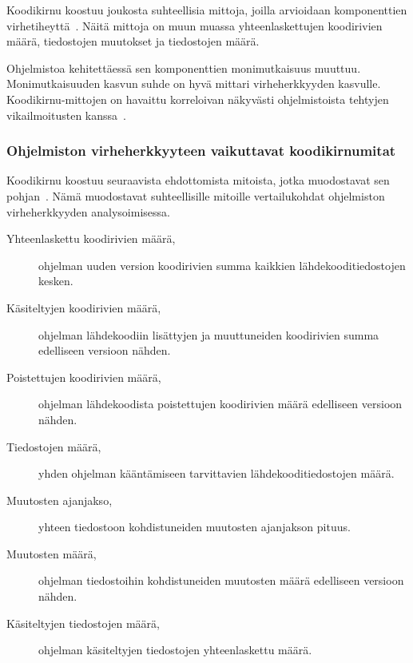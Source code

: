 \documentclass[finnish]{../tktltiki2}
\theoremstyle{definition}
\theoremstyle{remark}
\begin{document}
    Koodikirnu koostuu joukosta suhteellisia mittoja, joilla arvioidaan komponenttien virhetiheyttä~\cite{NB05}. Näitä 
mittoja on muun muassa yhteenlaskettujen koodirivien määrä, tiedostojen muutokset ja tiedostojen määrä.

    Ohjelmistoa kehitettäessä sen komponenttien monimutkaisuus muuttuu. Monimutkaisuuden kasvun suhde on hyvä mittari 
virheherkkyyden kasvulle. Koodikirnu-mittojen on havaittu korreloivan näkyvästi ohjelmistoista tehtyjen vikailmoitusten 
kanssa~\cite{NB05}.

\subsubsection{Ohjelmiston virheherkkyyteen vaikuttavat koodikirnumitat}

Koodikirnu koostuu seuraavista ehdottomista mitoista, jotka muodostavat sen pohjan~\cite{NB05}. Nämä muodostavat 
suhteellisille mitoille vertailukohdat ohjelmiston virheherkkyyden analysoimisessa.

\begin{description}
    
    \item[Yhteenlaskettu koodirivien määrä,] ohjelman uuden version koodirivien summa kaikkien lähdekooditiedostojen 
                                             kesken.
    
    \item[Käsiteltyjen koodirivien määrä,] ohjelman lähdekoodiin lisättyjen ja muuttuneiden koodirivien summa 
                                           edelliseen versioon nähden.
    
    \item[Poistettujen koodirivien määrä,] ohjelman lähdekoodista poistettujen koodirivien määrä edelliseen versioon 
                                           nähden.
    
    \item[Tiedostojen määrä,] yhden ohjelman kääntämiseen tarvittavien lähdekoodi\-tiedostojen määrä.
    
    \item[Muutosten ajanjakso,] yhteen tiedostoon kohdistuneiden muutosten ajanjakson pituus.
    
    \item[Muutosten määrä,] ohjelman tiedostoihin kohdistuneiden muutosten määrä edelliseen versioon nähden.
    
    \item[Käsiteltyjen tiedostojen määrä,] ohjelman käsiteltyjen tiedostojen yhteenlaskettu määrä.

\end{description}
\end{document}
